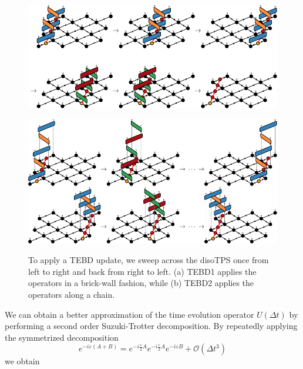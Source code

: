 \begin{figure}
	\centering
	\subcaptionbox{\label{fig:YB_isoTPS_TEBD_global_update_applying_TEBD1}}
	{%
		\includegraphics[scale=1]{figures/tikz/YB_isoTPS/tebd_global_update_steps/tebd_global_update_steps_a.pdf}
	}
	\par\bigskip\medskip
	\subcaptionbox{\label{fig:YB_isoTPS_TEBD_global_update_applying_TEBD2}}
	{%
		\includegraphics[scale=1]{figures/tikz/YB_isoTPS/tebd_global_update_steps/tebd_global_update_steps_b.pdf}
	}
	\caption{To apply a TEBD update, we sweep across the disoTPS once from left to right and back from right to left. (a) TEBD1 applies the operators in a brick-wall fashion, while (b) TEBD2 applies the operators along a chain.}
	\label{fig:YB_isoTPS_TEBD_global_update_applying_TEBD}
\end{figure}
We can obtain a better approximation of the time evolution operator $U(\Delta t)$ by performing a second order Suzuki-Trotter decomposition. By repeatedly applying the symmetrized decomposition
\begin{equation}
	e^{-i\varepsilon(A+B)} = e^{-i\frac{\varepsilon}{2}A}e^{-i\frac{\varepsilon}{2}A}e^{-i\varepsilon B} + \mathcal{O}(\Delta t^3)
\end{equation}
we obtain

